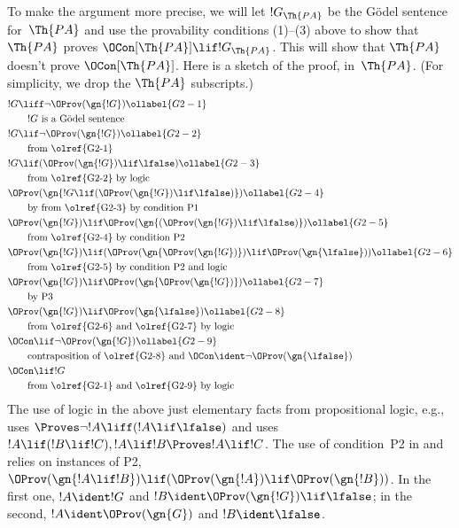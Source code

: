 \documentclass[../../../include/open-logic-section]{subfiles}
\begin{document}
To make the argument more precise, we will let $!G_\Th{PA}$ be the
G\"odel sentence for~$\Th{PA}$ and use the provability conditions
(1)--(3) above to show that $\Th{PA}$ proves $\OCon[\Th{PA}] \lif
!G_\Th{PA}$. This will show that $\Th{PA}$ doesn't prove
$\OCon[\Th{PA}]$. Here is a sketch of the proof, in~$\Th{PA}$. (For
simplicity, we drop the $\Th{PA}$ subscripts.)
\begin{align}
& !G \liff \lnot \OProv(\gn{!G}) \ollabel{G2-1}\\
& \qquad\text{$!G$ is a G\"odel sentence}\notag \\
& !G \lif \lnot \OProv(\gn{!G}) \ollabel{G2-2}\\
  & \qquad\text{from \olref{G2-1}} \notag\\
& !G \lif
  (\OProv(\gn{!G}) \lif \lfalse) \ollabel{G2-3}\\
  & \qquad\text{from \olref{G2-2} by logic}\notag\\
& \OProv(\gn{
    !G \lif
    (\OProv(\gn{!G}) \lif \lfalse)
  }) \ollabel{G2-4}\\
  & \qquad\text{by from \olref{G2-3} by condition P1} \notag\\
& \OProv(\gn{!G}) \lif
  \OProv(\gn{
    (\OProv(\gn{!G}) \lif \lfalse)
    }) \ollabel{G2-5}\\
  & \qquad\text{from \olref{G2-4} by condition P2} \notag\\
& \OProv(\gn{!G}) \lif (\OProv(\gn{\OProv(\gn{!G})}) \lif \OProv(\gn{\lfalse})) \ollabel{G2-6}\\
  & \qquad\text{from \olref{G2-5} by condition P2 and logic} \notag\\
& \OProv(\gn{!G}) \lif 
  \OProv(\gn{\OProv(\gn{!G})}) \ollabel{G2-7}\\
   & \qquad\text{by P3} \notag\\
& \OProv(\gn{!G}) \lif \OProv(\gn{\lfalse}) \ollabel{G2-8}\\
  & \qquad \text{from \olref{G2-6} and \olref{G2-7} by logic}\notag\\
& \OCon \lif \lnot \OProv(\gn{!G}) \ollabel{G2-9}\\
  & \qquad\text{contraposition of \olref{G2-8} and $\OCon \ident \lnot \OProv(\gn{\lfalse})$}\notag \\
& \OCon \lif !G \notag\\
  & \qquad\text{from \olref{G2-1} and \olref{G2-9} by logic}\notag
\end{align}
The use of logic in the above just elementary facts from propositional
logic, e.g.,  uses $\Proves \lnot!A \liff (!A\lif
\lfalse)$ and  uses $!A \lif (!B \lif !C), !A \lif !B
\Proves !A \lif !C$. The use of condition~P2 in  and
 relies on instances of P2, $\OProv(\gn{!A \lif !B}) \lif
(\OProv(\gn{!A}) \lif \OProv(\gn{!B}))$. In the first one, $!A \ident
!G$ and $!B \ident \OProv(\gn{!G}) \lif \lfalse$; in the second, $!A
\ident \OProv(\gn{G})$ and $!B \ident \lfalse$.
\end{document}
